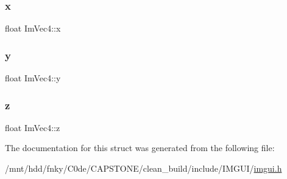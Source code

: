 \mbox{\label{structImVec4_a2090f651f5e5b78fedae8dab87343db6}} 
\subsubsection{\texorpdfstring{x}{x}}
{\footnotesize\ttfamily float Im\+Vec4\+::x}

\mbox{\label{structImVec4_a6b4d00ae261be4fe54353c759c561fe7}} 
\subsubsection{\texorpdfstring{y}{y}}
{\footnotesize\ttfamily float Im\+Vec4\+::y}

\mbox{\label{structImVec4_aba6a75356917a28c967954bb29133a1a}} 
\subsubsection{\texorpdfstring{z}{z}}
{\footnotesize\ttfamily float Im\+Vec4\+::z}



The documentation for this struct was generated from the following file\+:\begin{DoxyCompactItemize}
\item 
/mnt/hdd/fnky/\+C0de/\+C\+A\+P\+S\+T\+O\+N\+E/clean\+\_\+build/include/\+I\+M\+G\+U\+I/\hyperlink{imgui_8h}{imgui.\+h}\end{DoxyCompactItemize}
